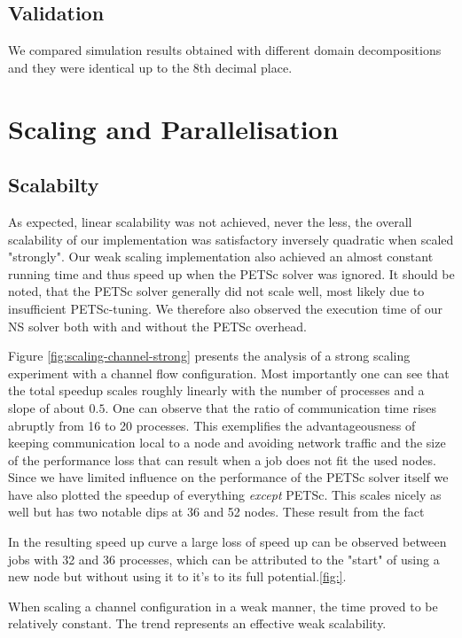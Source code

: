 \documentclass[11pt,a4paper]{article}
\begin{document}
\subsection{Validation}

We compared simulation results obtained with different domain decompositions and
they were identical up to the 8th decimal place.

\section{Scaling and Parallelisation}
\subsection{Scalabilty}

As expected, linear scalability was not achieved, never the less, the overall
scalability of our implementation was satisfactory inversely quadratic when
scaled "strongly". Our weak scaling implementation also achieved an almost
constant running time and thus speed up when the PETSc solver was ignored. It
should be noted, that the PETSc solver generally did not scale well, most likely
due to insufficient PETSc-tuning. We therefore also observed the execution time
of our NS solver both with and without the PETSc overhead.

Figure \ref{fig:scaling-channel-strong} presents the analysis of a strong
scaling experiment with a channel flow configuration. Most importantly one can
see that the total speedup scales roughly linearly with the number of processes
and a slope of about $0.5$. One can observe that the ratio of communication time
rises abruptly from 16 to 20 processes. This exemplifies the advantageousness of
keeping communication local to a node and avoiding network traffic and the size
of the performance loss that can result when a job does not fit the used
nodes. Since we have limited influence on the performance of the PETSc solver
itself we have also plotted the speedup of everything \emph{except} PETSc. This
scales nicely as well but has two notable dips at 36 and 52 nodes. These result
from the fact

In the resulting speed up curve a large loss of speed up can be observed
between jobs with 32 and 36 processes, which can be attributed to the "start" of
using a new node but without using it to it's to its full potential.\ref{fig:}.

When scaling a channel configuration in a weak manner, the time proved to be
relatively constant. The trend represents an effective weak scalability.
\end{document}
